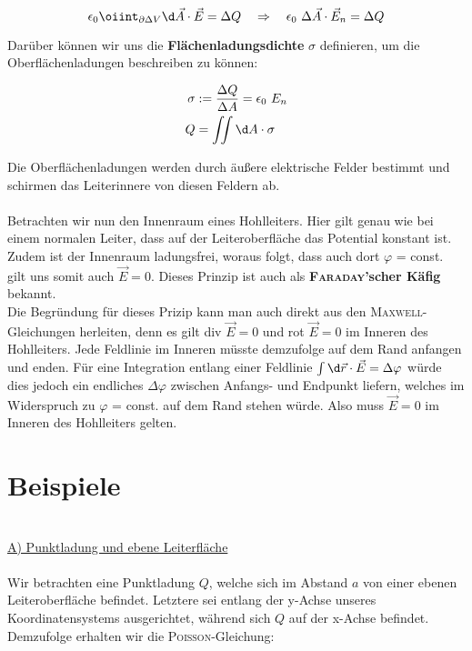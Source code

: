 \begin{equation*}
\epsilon_0 \oiint_{\partial\Delta V}\d\vec{A}\cdot\vec{E} = \Delta Q \quad \Rightarrow \quad \epsilon_0 \ \Delta\vec{A}\cdot\vec{E}_n = \Delta Q
\end{equation*}

Darüber können wir uns die \textbf{Flächenladungsdichte} $\sigma$ definieren, um die Oberflächenladungen beschreiben zu können:

\begin{align*}
\sigma &:= \frac{\Delta Q}{\Delta A} = \epsilon_0 \ E_n\\
Q  &= \iint\d A \cdot \sigma
\end{align*}

Die Oberflächenladungen werden durch äußere elektrische Felder bestimmt und schirmen das Leiterinnere von diesen Feldern ab.\
\\
\ \\
Betrachten wir nun den Innenraum eines Hohlleiters. Hier gilt genau wie bei einem normalen Leiter, dass auf der Leiteroberfläche das Potential konstant ist. Zudem ist der Innenraum ladungsfrei, woraus folgt, dass auch dort $\varphi$ = const. gilt uns somit auch $\vec{E} = 0$. Dieses Prinzip ist auch als \textbf{\textsc{Faraday}'scher Käfig} bekannt.\
\\
Die Begründung für dieses Prizip kann man auch direkt aus den \textsc{Maxwell}-Gleichungen herleiten, denn es gilt div $\vec{E} = 0$ und rot $\vec{E} = 0$ im Inneren des Hohlleiters. Jede Feldlinie im Inneren müsste demzufolge auf dem Rand anfangen und enden. Für eine Integration entlang einer Feldlinie $\int\d \vec{r} \cdot \vec{E} = \Delta \varphi$ würde dies jedoch ein endliches $\Delta \varphi$ zwischen Anfangs- und Endpunkt liefern, welches im Widerspruch zu $\varphi$ = const. auf dem Rand stehen würde. Also muss $\vec{E} = 0$ im Inneren des Hohlleiters gelten.

\section{Beispiele}
\ \\
\underline{A)  Punktladung und ebene Leiterfläche}\
\\
\ \\
Wir betrachten eine Punktladung $Q$, welche sich im Abstand $a$ von einer ebenen Leiteroberfläche befindet. Letztere sei entlang der y-Achse unseres Koordinatensystems ausgerichtet, während sich $Q$ auf der x-Achse befindet.
Demzufolge erhalten wir die \textsc{Poisson}-Gleichung:

